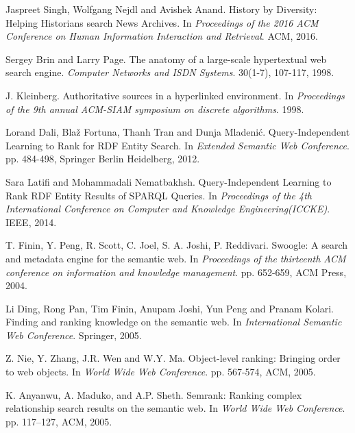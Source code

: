 \documentclass{article}
\begin{document}
    \begin{thebibliography}{100}

        Jaspreet Singh, Wolfgang Nejdl and Avishek Anand.
        History by Diversity: Helping Historians search News Archives.
        In \emph{Proceedings of the 2016 ACM Conference on Human Information Interaction and Retrieval}.
        ACM, 2016.

        Sergey Brin and Larry Page.
        The anatomy of a large-scale hypertextual web search engine.
        \emph{Computer Networks and ISDN Systems}.
        30(1-7), 107-117, 1998.

        J. Kleinberg.
        Authoritative sources in a hyperlinked environment.
        In \emph{Proceedings of the 9th annual ACM-SIAM symposium on discrete algorithms}.
        1998.

        Lorand Dali, Bla\v{z} Fortuna, Thanh Tran and Dunja Mladeni\'{c}.
        Query-Independent Learning to Rank for RDF Entity Search.
        In \emph{Extended Semantic Web Conference}.
        pp. 484-498,
        Springer Berlin Heidelberg, 2012.

        Sara Latifi and Mohammadali Nematbakhsh.
        Query-Independent Learning to Rank RDF Entity Results of SPARQL Queries.
        In \emph{Proceedings of the 4th International Conference on Computer and Knowledge Engineering(ICCKE)}.
        IEEE, 2014.

        T. Finin, Y. Peng, R. Scott,  C. Joel, S. A. Joshi, P. Reddivari.
        Swoogle: A search and metadata engine for the semantic web.
        In \emph{Proceedings of the thirteenth ACM conference on information and knowledge management}.
        pp. 652-659,
        ACM Press, 2004.

        Li Ding, Rong Pan, Tim Finin, Anupam Joshi, Yun Peng and Pranam Kolari.
        Finding and ranking knowledge on the semantic web.
        In \emph{International Semantic Web Conference}.
        Springer, 2005.

        Z. Nie, Y. Zhang, J.R. Wen and W.Y. Ma.
        Object-level ranking: Bringing order to web objects.
        In \emph{World Wide Web Conference}.
        pp. 567-574,
        ACM, 2005.

        K. Anyanwu, A. Maduko, and A.P. Sheth.
        Semrank: Ranking complex relationship search results on the semantic web.
        In \emph{World Wide Web Conference}.
        pp. 117–127,
        ACM, 2005.


\end{thebibliography}
\end{document}
